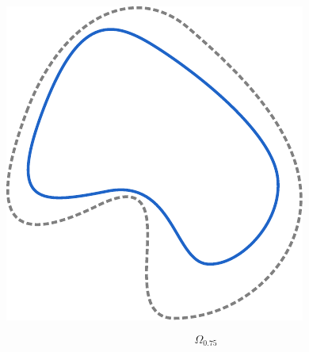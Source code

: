 \documentclass[crop, fleqn]{standalone}
\begin{document}
\begin{minipage}{60pt}
    \includegraphics[width=\linewidth]{main-theorem/omega-2.pdf}

    \vspace*{-30pt}

    \[ \Omega_{0.75} \]

    \vspace*{2pt}
\end{minipage}
\hspace{3pt}
\end{document}
